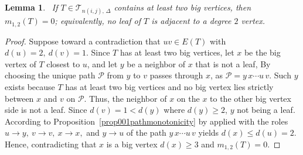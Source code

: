 \documentclass[12pt]{amsart}
\newtheorem{lemma}[theorem]{Lemma}
\newcommand{\TT}{\mathcal{T}}
\begin{document}
\begin{lemma}~\label{lemm21zero}
If $T\in \TT_{n(i,j),\,\Delta}$  contains at least two big vertices, then $m_{1,2}(T)=0$; equivalently, no leaf of $T$ is adjacent to a degree $2$ vertex.
\end{lemma}
\begin{proof}
Suppose toward a contradiction that $uv\in E(T)$ with $d(u)=2,\ d(v)=1$. Since
$T$ has at least two big vertices, let $x$ be the big vertex of $T$ closest to
$u$, and let $y$ be a neighbor of $x$ that is not a leaf,
By choosing the unique path $\mathcal P$ from $y$ to $v$ passes through $x$, as
$\mathcal P = y\,x\cdots u\,v$. Such $y$ exists because $T$ has at least two big
vertices and no big vertex lies strictly between $x$ and $v$ on $\mathcal P$. Thus, the neighbor of $x$ on the $x$ to the other big vertex side is not a leaf. Since $d(v)=1<d(y)$ where $d(y)\geqslant 2$, $y$ not being a leaf. According to Proposition~\ref{prop001pathmonotonicity} by applied with the roles $u\to y,\ v\to v,\ x\to x,$ and $y\to u$ of the path $y\,x\cdots u\,v$ yields $d(x)\leqslant d(u)=2$. Hence, contradicting that $x$ is a big vertex $d(x)\geqslant 3$ and $m_{1,2}(T)=0$.
\end{proof}
\end{document}
